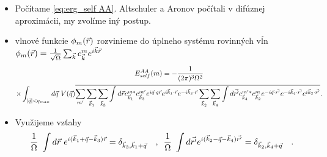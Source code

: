 \documentclass[
	11pt, %
]{beamer}
\begin{document}
\begin{frame}
\begin{itemize}
\item Počítame \eqref{eq:erg_self AA}. Altschuler a Aronov počítali v difúznej aproximácii, my zvolíme iný postup.
\item vlnové funkcie $\phi_m(\vec{r})$ rozvinieme do úplneho systému rovinných vĺn $\phi_m(\vec{r}) = \frac{1}{\sqrt{\Omega}}\sum_{\vec{k}}c_{\vec{k}}^me^{i\vec{k}\vec{r}}$
\tiny
\begin{multline}
E_{self}^{AA}(m)=  - \frac{1}{(2\pi)^3\Omega^2}     \\
\times  \int_{|\vec{q}| < q_{max}} d\vec{q}\ V(\vec{q})\overline{ \sum_{m'} \sum_{\vec{k}_1} \sum_{\vec{k}_3}\int d\vec{r} c^{m*}_{\vec{k}_1}c^{m'}_{\vec{k}_3}e^{i\vec{q}\cdot q\vec{r}}e^{i\vec{k}_1\cdot \vec{r}}e^{-i\vec{k}_3\cdot \vec{r}} \sum_{\vec{k}_2}\sum_{\vec{k}_4} \int d\vec{r'} c^{m'*}_{\vec{k}_4}c^{m}_{\vec{k}_2}e^{-i\vec{q}\cdot \vec{r'}}e^{-i\vec{k}_4\cdot \vec{r'}}e^{i\vec{k}_2\cdot \vec{r'}}} \text{.}
\end{multline}
\normalsize
\item Využijeme vzťahy
\begin{equation}
\frac{1}{\Omega}\ \int d\vr\ e^{i(\vk_1+\vq-\vk_3)\vr}=\delta_{\vk_3,\vk_1+\vq}
\  \   \  \text{,}
\ \
\frac{1}{\Omega} \ \int d\vrp e^{i(\vk_2-\vq-\vk_4)\vrp}=\delta_{\vk_2,\vk_4+\vq}
\ \ \  \text{.}
\end{equation}

\end{itemize}
\end{frame}
\end{document}
